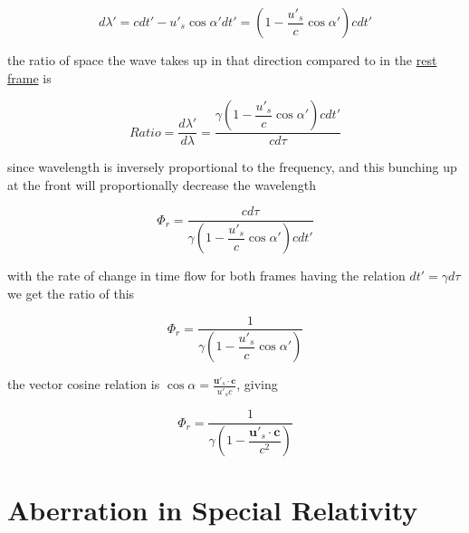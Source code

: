 \begin{equation}
	d\lambda' = cdt' - u'_s \cos\alpha' dt'= (1-\frac{u'_s}{c}\cos\alpha')cdt'
\end{equation}

the ratio of space the wave takes up in that direction compared to in the \hyperlink{def-proper-frame}{rest frame} is

\begin{equation}
	Ratio = \frac{d\lambda'}{d\lambda} = \frac{ \gamma \left(1-\dfrac{u'_s}{c}  \cos\alpha' \right) c dt'}{c d\tau}
\end{equation}

since wavelength is inversely proportional to the frequency, and this bunching up at the front will proportionally decrease the wavelength

\begin{equation}
	\Phi_r = \frac{c d\tau}{ \gamma \left(1-\dfrac{u'_s}{c}  \cos\alpha' \right) c dt'}
\end{equation}

with the rate of change in time flow for both frames having the relation $dt'=\gamma d\tau$ we get the ratio of this

\begin{equation}
	\Phi_r = \frac{1}{ \gamma \left(1-\dfrac{u'_s}{c}  \cos\alpha' \right)}
\end{equation}

the vector cosine relation is $\cos\alpha = \frac{\mathbf{u}'_s \cdot \mathbf{c}}{u'_s c}$, giving

\begin{equation}
	\Phi_r = \frac{1}{ \gamma \left(1-\dfrac{\mathbf{u}'_s \cdot \mathbf{c}}{ c^2} \right)}
\end{equation}

\section{Aberration in Special Relativity}

